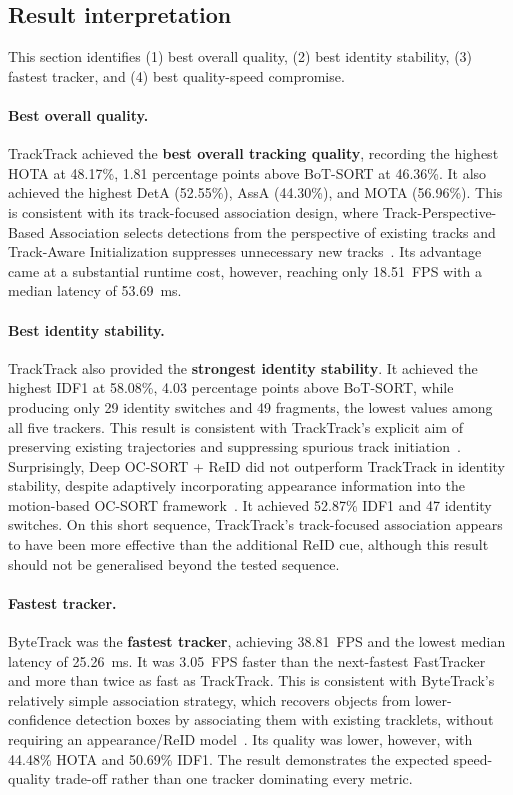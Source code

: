 \documentclass[11pt,a4paper]{article}
\begin{document}
\subsection{Result interpretation}

This section identifies (1) best overall quality, (2) best identity stability, (3) fastest tracker, and (4) best quality-speed compromise.

\paragraph{Best overall quality.} TrackTrack achieved the \textbf{best overall tracking quality}, recording the highest HOTA at 48.17\%, 1.81 percentage points above BoT-SORT at 46.36\%. It also achieved the highest DetA (52.55\%), AssA (44.30\%), and MOTA (56.96\%). This is consistent with its track-focused association design, where Track-Perspective-Based Association selects detections from the perspective of existing tracks and Track-Aware Initialization suppresses unnecessary new tracks~\cite{shim2025tracktrack}. Its advantage came at a substantial runtime cost, however, reaching only 18.51~FPS with a median latency of 53.69~ms.

\paragraph{Best identity stability.} TrackTrack also provided the \textbf{strongest identity stability}. It achieved the highest IDF1 at 58.08\%, 4.03 percentage points above BoT-SORT, while producing only 29 identity switches and 49 fragments, the lowest values among all five trackers. This result is consistent with TrackTrack's explicit aim of preserving existing trajectories and suppressing spurious track initiation~\cite{shim2025tracktrack}. Surprisingly, Deep OC-SORT + ReID did not outperform TrackTrack in identity stability, despite adaptively incorporating appearance information into the motion-based OC-SORT framework~\cite{maggiolino2023deepocsort}. It achieved 52.87\% IDF1 and 47 identity switches. On this short sequence, TrackTrack's track-focused association appears to have been more effective than the additional ReID cue, although this result should not be generalised beyond the tested sequence.

\paragraph{Fastest tracker.} ByteTrack was the \textbf{fastest tracker}, achieving 38.81~FPS and the lowest median latency of 25.26~ms. It was 3.05~FPS faster than the next-fastest FastTracker and more than twice as fast as TrackTrack. This is consistent with ByteTrack's relatively simple association strategy, which recovers objects from lower-confidence detection boxes by associating them with existing tracklets, without requiring an appearance/ReID model~\cite{zhang2022bytetrack}. Its quality was lower, however, with 44.48\% HOTA and 50.69\% IDF1. The result demonstrates the expected speed-quality trade-off rather than one tracker dominating every metric.
\end{document}
